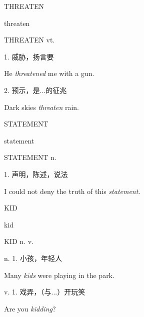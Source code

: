 \begin{flashcard}{
THREATEN

threaten
}
\begin{center}
THREATEN vt. 
\end{center}
1. 威胁，扬言要

He \textit{threatened} me with a gun.

2. 预示，是...的征兆

Dark skies \textit{threaten} rain.

\end{flashcard}
\begin{flashcard}{
STATEMENT

statement
}
\begin{center}
STATEMENT n. 
\end{center}
1. 声明，陈述，说法

I could not deny the truth of this \textit{statement}.

\end{flashcard}
\begin{flashcard}{
KID

kid
}
\begin{center}
KID n. v. \textipa{[kid]}
\end{center}
n. 1. 小孩，年轻人

Many \textit{kids} were playing in the park.

v. 1. 戏弄，（与...）开玩笑

Are you \textit{kidding}?

\end{flashcard}
